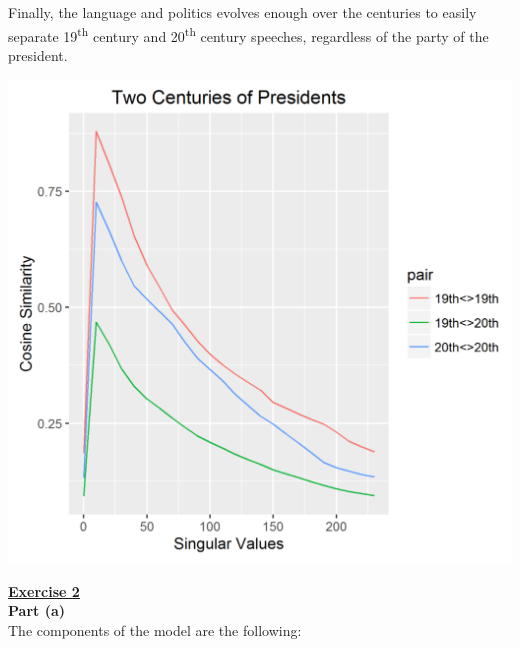 \documentclass[a4paper, 11pt]{article}
\begin{document}
Finally, the language and politics evolves enough over the centuries to easily separate 19\textsuperscript{th} century and 20\textsuperscript{th} century speeches, regardless of the party of the president.
\begin{center}
\includegraphics[scale=0.45]{plot3.png}
\end{center}
\pagebreak
\textbf{\underline{Exercise 2}}\\
\newline \textbf{Part (a)}\\
\newline The components of the model are the following:
\end{document}
